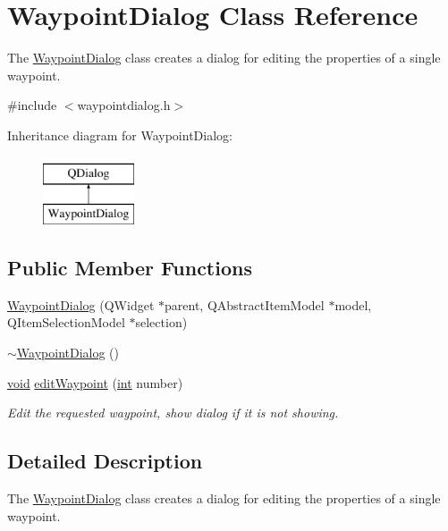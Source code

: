 \hypertarget{class_waypoint_dialog}{\section{Waypoint\-Dialog Class Reference}
\label{class_waypoint_dialog}
}


The \hyperlink{class_waypoint_dialog}{Waypoint\-Dialog} class creates a dialog for editing the properties of a single waypoint.  




{\ttfamily \#include $<$waypointdialog.\-h$>$}

Inheritance diagram for Waypoint\-Dialog\-:\begin{figure}[H]
\begin{center}
\leavevmode
\includegraphics[height=2.000000cm]{class_waypoint_dialog}
\end{center}
\end{figure}
\subsection*{Public Member Functions}
\begin{DoxyCompactItemize}
\item 
\hyperlink{group___path_planner_ga79559741b9fcf0a36768f7df92746760}{Waypoint\-Dialog} (Q\-Widget $\ast$parent, Q\-Abstract\-Item\-Model $\ast$model, Q\-Item\-Selection\-Model $\ast$selection)
\item 
\hyperlink{group___path_planner_ga54d6efacbe7553519262195483f76ed5}{$\sim$\-Waypoint\-Dialog} ()
\item 
\hyperlink{group___u_a_v_objects_plugin_ga444cf2ff3f0ecbe028adce838d373f5c}{void} \hyperlink{group___path_planner_ga903050cdff8176aeedca31eae8b7ea02}{edit\-Waypoint} (\hyperlink{ioapi_8h_a787fa3cf048117ba7123753c1e74fcd6}{int} number)
\begin{DoxyCompactList}\small\item\em Edit the requested waypoint, show dialog if it is not showing. \end{DoxyCompactList}\end{DoxyCompactItemize}


\subsection{Detailed Description}
The \hyperlink{class_waypoint_dialog}{Waypoint\-Dialog} class creates a dialog for editing the properties of a single waypoint. 

